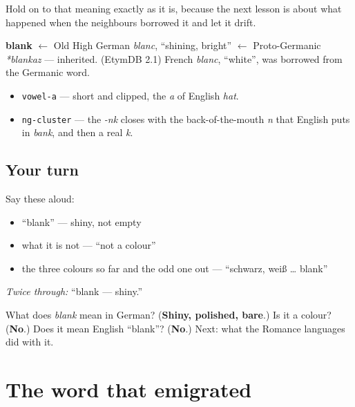Hold on to that meaning exactly as it is, because the next lesson is about what happened when the neighbours borrowed it and let it drift.

\begin{cousinweb}
\textbf{blank} $\leftarrow$ Old High German \emph{blanc}, \textquotedblleft{}shining, bright\textquotedblright{} $\leftarrow$ Proto-Germanic \emph{*blankaz} — inherited. (EtymDB 2.1) French \emph{blanc}, \textquotedblleft{}white\textquotedblright{}, was borrowed from the Germanic word.
\end{cousinweb}

\begin{sounds}
\begin{itemize}
\raggedright
  \item \texttt{vowel-a} — short and clipped, the \emph{a} of English \emph{hat}.
  \item \texttt{ng-cluster} — the \emph{-nk} closes with the back-of-the-mouth \emph{n} that English puts in \emph{bank}, and then a real \emph{k}.
\end{itemize}
\end{sounds}

\subsection*{Your turn}
Say these aloud:

\begin{itemize}
\raggedright
  \item \textquotedblleft{}blank\textquotedblright{} — shiny, not empty
  \item what it is not — \textquotedblleft{}not a colour\textquotedblright{}
  \item the three colours so far and the odd one out — \textquotedblleft{}schwarz, weiß … blank\textquotedblright{}
\end{itemize}

\emph{Twice through:} \textquotedblleft{}blank — shiny.\textquotedblright{}

\begin{tcolorbox}[breakable,colback=teal!4,colframe=teal!35!black,title={Before you move on}]
What does \emph{blank} mean in German? (\textbf{Shiny, polished, bare}.) Is it a colour? (\textbf{No}.) Does it mean English \textquotedblleft{}blank\textquotedblright{}? (\textbf{No}.) Next: what the Romance languages did with it.
\end{tcolorbox}
\section[blank, blanc, bianco]{The word that emigrated}

